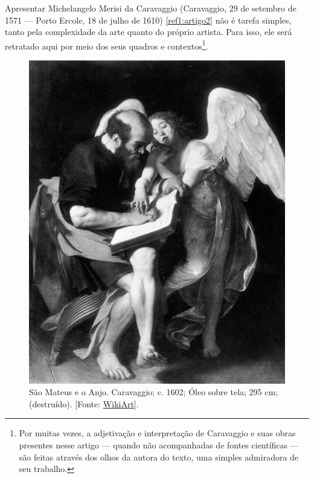 \newcommand{\artigodois}{\begin{center}\textcolor{base}{\MakeUppercase{À Luz de Caravaggio}}\end{center}}

\begin{multicols}{2}

Apresentar Michelangelo Merisi da Caravaggio (Caravaggio, 29 de setembro de 1571 — Porto Ercole, 18 de julho de 1610) \ref{ref1:artigo2} não é tarefa simples, tanto pela complexidade da arte quanto do próprio artista. Para isso, ele será retratado aqui por meio dos seus quadros e contextos\footnote{Por muitas vezes, a adjetivação e interpretação de Caravaggio e suas obras presentes nesse artigo --- quando não acompanhadas de fontes científicas --- são feitas através dos olhos da autora do texto, uma simples admiradora de seu trabalho.}. 

\begin{figure}[H]
	\centering
	\includegraphics[width=0.9\linewidth]{Figuras/Artigo2/m1.jpg}
	\protect\caption{São Mateus e o Anjo. Caravaggio; c. 1602; Óleo sobre tela; 295 cm; (destruído). [Fonte: \href{https://www.wikiart.org/pt/caravaggio}{WikiArt}].}
	\label{fig:m1}
\end{figure}


\end{multicols}
